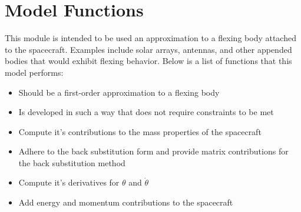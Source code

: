 \section{Model Functions}

This module is intended to be used an approximation to a flexing body attached to the spacecraft. Examples include solar arrays, antennas, and other appended bodies that would exhibit flexing behavior. Below is a list of functions that this model performs:

\begin{itemize}
	\item Should be a first-order approximation to a flexing body
	\item Is developed in such a way that does not require constraints to be met
	\item Compute it's contributions to the mass properties of the spacecraft
	\item Adhere to the back substitution form and provide matrix contributions for the back substitution method
	\item Compute it's derivatives for $\theta$ and $\dot{\theta}$
	\item Add energy and momentum contributions to the spacecraft
\end{itemize}